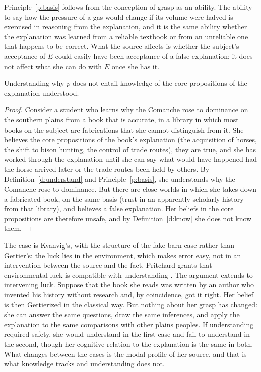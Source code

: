 \documentclass{situationist-preprint}
\begin{document}
Principle~\ref{p:basis} follows from the conception of grasp as an ability. The ability to say how the pressure of a gas would change if its volume were halved is exercised in reasoning from the explanation, and it is the same ability whether the explanation was learned from a reliable textbook or from an unreliable one that happens to be correct. What the source affects is whether the subject's acceptance of $E$ could easily have been acceptance of a false explanation; it does not affect what she can do with $E$ once she has it.

\begin{theorem}\label{t:luck}
Understanding why $p$ does not entail knowledge of the core propositions of the explanation understood.
\end{theorem}

\begin{proof}
Consider a student who learns why the Comanche rose to dominance on the southern plains from a book that is accurate, in a library in which most books on the subject are fabrications that she cannot distinguish from it. She believes the core propositions of the book's explanation (the acquisition of horses, the shift to bison hunting, the control of trade routes), they are true, and she has worked through the explanation until she can say what would have happened had the horse arrived later or the trade routes been held by others. By Definition~\ref{d:understand} and Principle~\ref{p:basis}, she understands why the Comanche rose to dominance. But there are close worlds in which she takes down a fabricated book, on the same basis (trust in an apparently scholarly history from that library), and believes a false explanation. Her beliefs in the core propositions are therefore unsafe, and by Definition~\ref{d:know} she does not know them.
\end{proof}

The case is Kvanvig's, with the structure of the fake-barn case rather than Gettier's: the luck lies in the environment, which makes error easy, not in an intervention between the source and the fact. Pritchard grants that environmental luck is compatible with understanding \citep{Pritchard2010}. The argument extends to intervening luck. Suppose that the book she reads was written by an author who invented his history without research and, by coincidence, got it right. Her belief is then Gettierized in the classical way. But nothing about her grasp has changed: she can answer the same questions, draw the same inferences, and apply the explanation to the same comparisons with other plains peoples. If understanding required safety, she would understand in the first case and fail to understand in the second, though her cognitive relation to the explanation is the same in both. What changes between the cases is the modal profile of her source, and that is what knowledge tracks and understanding does not.
\end{document}
